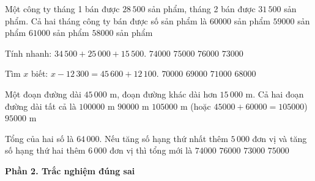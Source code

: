 \begin{ex} %
Một công ty tháng 1 bán được $28\,500$ sản phẩm, tháng 2 bán được $31\,500$ sản phẩm. Cả hai tháng công ty bán được số sản phẩm là
\choice
{\True $60000$ sản phẩm}
{$59000$ sản phẩm}
{$61000$ sản phẩm}
{$58000$ sản phẩm}
\end{ex}

\begin{ex} %
Tính nhanh: $34\,500 + 25\,000 + 15\,500$.
\choice
{$74000$}
{\True $75000$}
{$76000$}
{$73000$}
\end{ex}

\begin{ex} %
Tìm $x$ biết: $x - 12\,300 = 45\,600 + 12\,100$.
\choice
{\True $70000$}
{$69000$}
{$71000$}
{$68000$}
\end{ex}

\begin{ex} %
Một đoạn đường dài $45\,000\text{ m}$, đoạn đường khác dài hơn $15\,000\text{ m}$. Cả hai đoạn đường dài tất cả là
\choice
{$100000\text{ m}$}
{$90000\text{ m}$}
{\True $105000\text{ m}$ (hoặc $45000 + 60000 = 105000$)}
{$95000\text{ m}$}
\end{ex}

\begin{ex} %
Tổng của hai số là $64\,000$. Nếu tăng số hạng thứ nhất thêm $5\,000$ đơn vị và tăng số hạng thứ hai thêm $6\,000$ đơn vị thì tổng mới là
\choice
{$74000$}
{$76000$}
{$73000$}
{\True $75000$}
\end{ex}

\textbf{Phần 2. Trắc nghiệm đúng sai}

